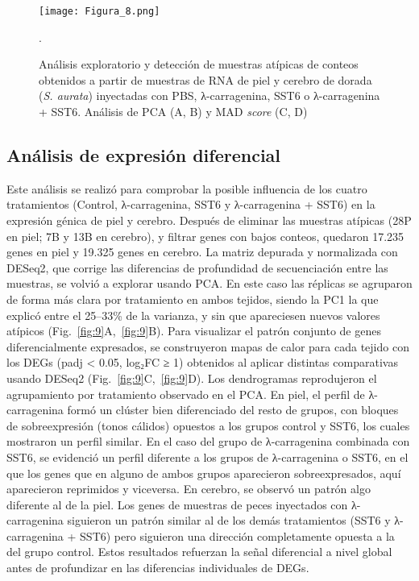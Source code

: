 \documentclass[10pt,a4paper]{article}
\begin{document}
\begin{figure}[ht]
  \centering
 \texttt{[image: Figura\_8.png]}
 
  \caption{Análisis exploratorio y detección de muestras atípicas de conteos obtenidos a partir de muestras de RNA de piel y cerebro de dorada (\textit{S. aurata}) inyectadas con PBS, λ-carragenina, SST6 o λ-carragenina + SST6. Análisis de PCA (A, B) y MAD \textit{score} (C, D)}.
  \label{fig:8}
\end{figure}

\subsection{Análisis de expresión diferencial}
Este análisis se realizó para comprobar la posible influencia de los cuatro tratamientos (Control, λ-carragenina, SST6 y λ-carragenina + SST6) en la expresión génica de piel y cerebro. Después de eliminar las muestras atípicas (28P en piel; 7B y 13B en cerebro), y filtrar genes con bajos conteos, quedaron 17.235 genes en piel y 19.325 genes en cerebro. La matriz depurada y normalizada con DESeq2, que corrige las diferencias de profundidad de secuenciación entre las muestras, se volvió a explorar usando PCA. En este caso las réplicas se agruparon de forma más clara por tratamiento en ambos tejidos, siendo la PC1 la que explicó entre el 25–33\% de la varianza, y sin que apareciesen nuevos valores atípicos (Fig.~\ref{fig:9}A,~\ref{fig:9}B). Para visualizar el patrón conjunto de genes diferencialmente expresados, se construyeron mapas de calor para cada tejido con los DEGs (padj < 0.05, log₂FC ≥ 1) obtenidos al aplicar distintas comparativas usando DESeq2 (Fig.~\ref{fig:9}C,~\ref{fig:9}D). Los dendrogramas reprodujeron el agrupamiento por tratamiento observado en el PCA. En piel, el perfil de λ-carragenina formó un clúster bien diferenciado del resto de grupos, con bloques de sobreexpresión (tonos cálidos) opuestos a los grupos control y SST6, los cuales mostraron un perfil similar. En el caso del grupo de λ-carragenina combinada con SST6, se evidenció un perfil diferente a los grupos de λ-carragenina o SST6, en el que los genes que en alguno de ambos grupos aparecieron sobreexpresados, aquí aparecieron reprimidos y viceversa. En cerebro, se observó un patrón algo diferente al de la piel. Los genes de muestras de peces inyectados con λ-carragenina siguieron un patrón similar al de los demás tratamientos (SST6 y λ-carragenina + SST6) pero siguieron una dirección completamente opuesta a la del grupo control. Estos resultados refuerzan la señal diferencial a nivel global antes de profundizar en las diferencias individuales de DEGs. 
\end{document}
